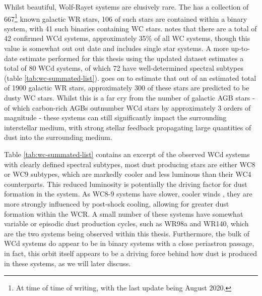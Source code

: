 Whilst beautiful, Wolf-Rayet systems are elusively rare.
The  \parencite{rossloweSpatialDistributionGalactic2015} has a collection of 667\footnote{At time of time of writing, with the last update being August 2020.} known galactic WR stars, 106 of such stars are contained within a binary system, with 41 such binaries containing WC stars.
\textcite{rossloweSpatialDistributionGalactic2015} notes that there are a total of 42 confirmed WCd systems, approximately 35\% of all WC systems, though this value is somewhat out out date and includes single star systems.
A more up-to-date estimate performed for this thesis using the updated dataset estimates a total of 80 WCd systems, of which 72 have well-determined spectral subtypes (table \ref{tab:wc-summated-list}).
\textcite{rossloweSpatialDistributionGalactic2015} goes on to estimate that out of an estimated total of 1900 galactic WR stars, approximately 300 of these stars are predicted to be dusty WC stars.
Whilst this is a far cry from the number of galactic AGB stars - of which carbon-rich AGBs outnumber WCd stars by approximately 3 orders of magnitude \parencite{ishiharaGalacticDistributionsCarbon2011} - these systems can still significantly impact the surrounding interstellar medium, with strong stellar feedback propagating large quantities of dust into the surrounding medium.

Table \ref{tab:wc-summated-list} contains an excerpt of the observed WCd systems with clearly defined spectral subtypes, most dust producing stars are either WC8 or WC9 subtypes, which are markedly cooler and less luminous than their WC4 counterparts.
This reduced luminosity is potentially the driving factor for dust formation in the system.
As WC8-9 systems have slower, cooler winds \parencite{niedzielskiKinematicalStructureWolfRayet2002}, they are more strongly influenced by post-shock cooling, allowing for greater dust formation within the WCR.
A small number of these systems have somewhat variable or episodic dust production cycles, such as WR98a and WR140, which are the two systems being observed within this thesis.
Furthermore, the bulk of WCd systems do appear to be in binary systems with a close periastron passage, in fact, this orbit itself appears to be a driving force behind how dust is produced in these systems, as we will later discuss.

